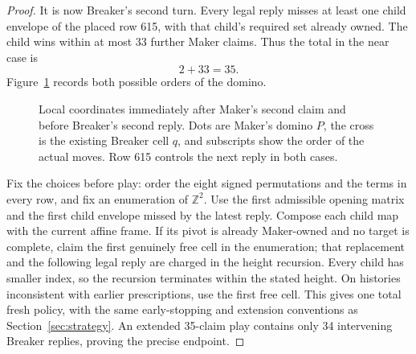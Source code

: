 \begin{proof}
It is now Breaker's second turn.  Every legal reply misses at least
one child envelope of the placed row 615, with that child's required
set already owned.  The child wins within at most 33 further Maker
claims.  Thus the total in the near case is
\[
 2+33=35.
\]
Figure~\ref{r35:near-figure} records both possible orders of the domino.

\begin{figure}[tb]
\centering
{}
\caption{Local coordinates immediately after Maker's second claim and
before Breaker's second reply.  Dots are Maker's domino \(P\), the
cross is the existing Breaker cell \(q\), and subscripts show the order
of the actual moves.  Row 615 controls the next reply in both cases.}
\label{r35:near-figure}
\end{figure}

Fix the choices before play: order the eight signed permutations and
the terms in every row, and fix an enumeration of \(\mathbb Z^2\).
Use the first admissible opening matrix and the first child envelope
missed by the latest reply.  Compose each child map with the current
affine frame.  If its pivot is already Maker-owned and no target is
complete, claim the first genuinely free cell in the enumeration;
that replacement and the following legal reply are charged in the
height recursion.  Every child has smaller index, so the recursion
terminates within the stated height.  On histories inconsistent with
earlier prescriptions, use the first free cell.  This gives one total
fresh policy, with the same early-stopping and extension conventions as
Section~\ref{sec:strategy}.  An extended 35-claim play contains only
34 intervening Breaker replies, proving the precise endpoint.
\end{proof}

